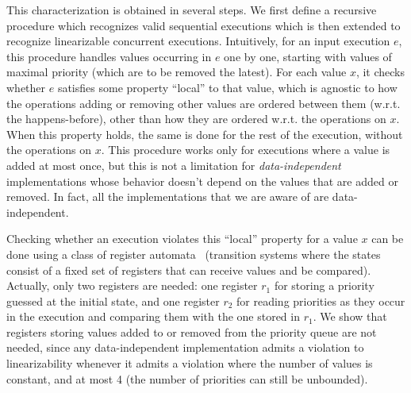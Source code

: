 This characterization is obtained in several steps. We first define a recursive procedure which recognizes valid sequential executions which is then extended to recognize linearizable concurrent executions. Intuitively, for an input execution $e$, this procedure handles values occurring in $e$ one by one, starting with values of maximal priority (which are to be removed the latest). For each value $x$, it checks whether $e$ satisfies some property ``local'' to that value, which is agnostic to how the operations adding or removing other values are ordered between them (w.r.t. the happens-before), other than how they are ordered w.r.t. the operations on $x$. When this property holds, the same is done for the rest of the execution, without the operations on $x$. This procedure works only for executions where a value is added at most once, but this is not a limitation for \emph{data-independent} implementations whose behavior doesn't depend on the values that are added or removed. In fact, all the implementations that we are aware of are data-independent.

Checking whether an execution violates this ``local'' property for a value $x$ can be done using a class of register automata~\cite{DBLP:journals/tcs/KaminskiF94,DBLP:conf/icalp/Cerans94,DBLP:conf/stacs/SegoufinT11} (transition systems where the states consist of a fixed set of registers that can receive values and be compared). Actually, only two registers are needed: one register $r_1$ for storing a priority guessed at the initial state, and one register $r_2$ for reading priorities as they occur in the execution and comparing them with the one stored in $r_1$. We show that registers storing values added to or removed from the priority queue are not needed, since any data-independent implementation admits a violation to linearizability whenever it admits a violation where the number of values is constant, and at most 4 (the number of priorities can still be unbounded).















